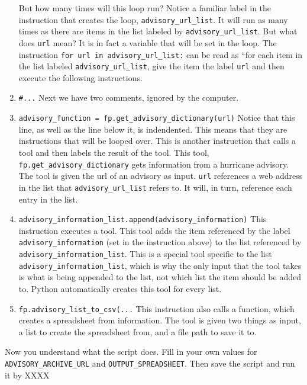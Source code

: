 \documentclass{article}
\begin{document}
\begin{enumerate}
    But how many times will this loop run?  Notice a familiar label in the instruction that creates the loop, \verb+advisory_url_list+.  It will run as many times as there are items in the list labeled by \verb+advisory_url_list+.  But what does \verb+url+ mean?  It is in fact a variable that will be set in the loop.  The instruction \verb+for url in advisory_url_list:+ can be read as ``for each item in the list labeled \verb+advisory_url_list+, give the item the label \verb+url+ and then execute the following instructions.
    \item \verb+#...+ Next we have two comments, ignored by the computer.
    \item \verb+advisory_function = fp.get_advisory_dictionary(url)+ Notice that this line, as well as the line below it, is indendented.  This means that they are instructions that will be looped over.  This is another instruction that calls a tool and then labels the result of the tool.  This tool, \verb+fp.get_advisory_dictionary+ gets information from a hurricane advisory.  The tool is given the url of an advisory as input.  \verb+url+ references a web address in the list that  \verb+advisory_url_list+ refers to.  It will, in turn, reference each entry in the list.
    \item \verb+advisory_information_list.append(advisory_information)+ This instruction executes a tool.  This tool adds the item referenced by the label \verb+advisory_information+ (set in the instruction above) to the list referenced by \verb+advisory_information_list+.  This is a special tool specific to the list \verb+advisory_information_list+, which is why the only input that the tool takes is what is being appended to the list, not which list the item should be added to.  Python automatically creates this tool for every list.
    \item \verb+fp.advisory_list_to_csv(...+ This instruction also calls a function, which creates a spreadsheet from information.  The tool is given two things as input, a list to create the spreadsheet from, and a file path to save it to.
\end{enumerate}

Now you understand what the script does.  Fill in your own values for \verb+ADVISORY_ARCHIVE_URL+ and \verb+OUTPUT_SPREADSHEET+.  Then save the script and run it by XXXX
\end{document}
